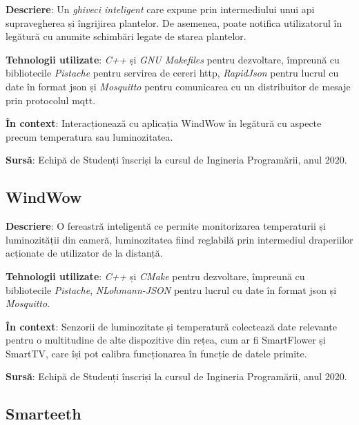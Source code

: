 \textbf{Descriere}:  Un \textit{ghiveci inteligent} care expune prin intermediului unui \acrshort{api} supravegherea și îngrijirea plantelor. De asemenea, poate notifica utilizatorul în legătură cu anumite schimbări legate de starea plantelor.

\textbf{Tehnologii utilizate}: \textit{C++} și \textit{GNU Makefiles} pentru dezvoltare, împreună cu bibliotecile \textit{Pistache} pentru servirea de cereri \acrfull{http}, \textit{RapidJson} pentru lucrul cu date în format \acrfull{json} și \textit{Mosquitto} pentru comunicarea cu un distribuitor de mesaje prin protocolul \acrfull{mqtt}. 

\textbf{În context}: Interacționează cu aplicația WindWow în legătură cu aspecte precum temperatura sau luminozitatea.

\textbf{Sursă}: Echipă de Studenți înscriși la cursul de Ingineria Programării, anul 2020.

\subsection*{WindWow}

\textbf{Descriere}:  O fereastră inteligentă ce permite monitorizarea temperaturii și luminozității din cameră, luminozitatea fiind reglabilă prin intermediul draperiilor acționate de utilizator de la distanță.

\textbf{Tehnologii utilizate}: \textit{C++} și \textit{CMake} pentru dezvoltare, împreună cu bibliotecile \textit{Pistache}, \textit{NLohmann-JSON} pentru lucrul cu date în format \acrshort{json} și \textit{Mosquitto}.

\textbf{În context}: Senzorii de luminozitate și temperatură colectează date relevante pentru o multitudine de alte dispozitive din rețea, cum ar fi SmartFlower și SmartTV, care își pot calibra funcționarea în funcție de datele primite.

\textbf{Sursă}: Echipă de Studenți înscriși la cursul de Ingineria Programării, anul 2020.

\subsection*{Smarteeth}


